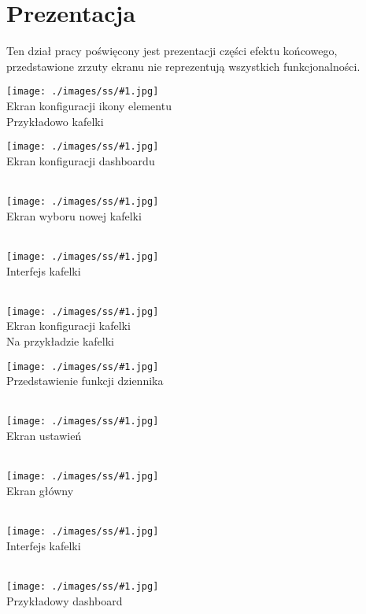 \newcommand{\screenShot}[2]{
    \begin{minipage}{0.48\textwidth}
        \centering
        \texttt{[image: ./images/ss/\#1.jpg]}\\
        #2
    \end{minipage}
}

\section{Prezentacja}
Ten dział pracy poświęcony jest prezentacji części efektu końcowego, przedstawione zrzuty ekranu nie reprezentują wszystkich funkcjonalności.\\

\screenShot{1}{Ekran konfiguracji ikony elementu\\Przykładowo kafelki}
\screenShot{2}{Ekran konfiguracji dashboardu\\\ }

\newpage

\screenShot{3}{Ekran wyboru nowej kafelki\\\ }
\screenShot{4}{Interfejs kafelki \\\ }

\newpage

\screenShot{5}{Ekran konfiguracji kafelki\\Na przykładzie kafelki \tcbox{Switch}}
\screenShot{6}{Przedstawienie funkcji dziennika\\\ }

\newpage

\screenShot{7}{Ekran ustawień\\\ }
\screenShot{8}{Ekran główny\\\ }

\newpage

\screenShot{9}{Interfejs kafelki \\\ }
\screenShot{10}{Przykładowy dashboard\\\ }